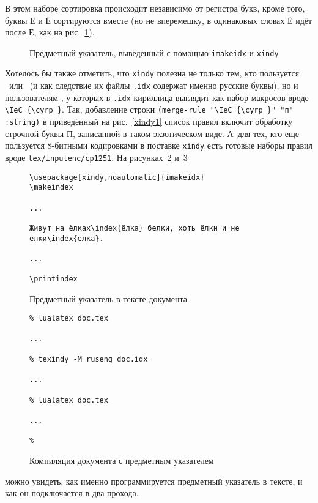 \documentclass[a4paper,12pt]{article}
\begin{document}
В этом наборе сортировка происходит независимо от регистра букв, кроме того, буквы
Е и Ё сортируются вместе (но не вперемешку, в одинаковых словах Ё идёт после Е,
как на рис.~\ref{xindy4}).
\begin{figure}[tp]
\centering
\small
\printindex
\caption{Предметный указатель, выведенный с помощью \texttt{imakeidx} и \texttt{xindy}}\label{xindy4}
\end{figure}
Хотелось бы также отметить, что \texttt{xindy} полезна не только тем, кто пользуется
\LuaLaTeX\ или \XeTeX\ (и как следствие их файлы \texttt{.idx} содержат именно русские буквы),
но и пользователям \pdfLaTeX, у которых в \texttt{.idx} кириллица выглядит как набор макросов
вроде \verb|\IeC {\cyrp }|. Так, добавление строки
\verb|(merge-rule "\IeC {\cyrp }" "п" :string)| в приведённый на рис.~\ref{xindy1} список правил
включит обработку строчной буквы П, записанной в таком экзотическом виде. А~для тех, кто
еще пользуется 8-битными кодировками в поставке \texttt{xindy} есть готовые наборы правил
вроде \texttt{tex/inputenc/cp1251}.
На рисунках~\ref{xindy2} и~\ref{xindy3}
\begin{figure}[tp]
\footnotesize
\begin{verbatim}
\usepackage[xindy,noautomatic]{imakeidx}
\makeindex

...

Живут на ёлках\index{ёлка} белки, хоть ёлки и не елки\index{елка}.

...

\printindex
\end{verbatim}
\caption{Предметный указатель в тексте документа}\label{xindy2}
\end{figure}
\begin{figure}[tp]
\footnotesize
\begin{verbatim}
% lualatex doc.tex

...

% texindy -M ruseng doc.idx

...

% lualatex doc.tex

...

%
\end{verbatim}
\caption{Компиляция документа с предметным указателем}\label{xindy3}
\end{figure}
можно увидеть, как именно программируется
предметный указатель в тексте, и как он подключается в два прохода.
\end{document}
